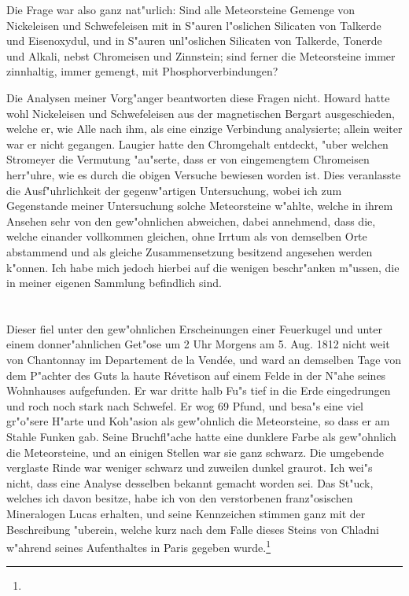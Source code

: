\documentclass[a4paper, 11pt, oneside]{article}
\begin{document}
Die Frage war also ganz nat"urlich: Sind alle Meteorsteine Gemenge von Nickeleisen und Schwefeleisen mit in S"auren l"oslichen Silicaten von Talkerde und Eisenoxydul, und in S"auren unl"oslichen Silicaten von Talkerde, Tonerde und Alkali, nebst Chromeisen und Zinnstein; sind ferner die Meteorsteine immer zinnhaltig, immer gemengt, mit Phosphorverbindungen?

Die Analysen meiner Vorg"anger beantworten diese Fragen nicht. Howard hatte wohl Nickeleisen und Schwefeleisen aus der magnetischen Bergart ausgeschieden, welche er, wie Alle nach ihm, als eine einzige Verbindung analysierte; allein weiter war er nicht gegangen. Laugier hatte den Chromgehalt entdeckt, "uber welchen Stromeyer die Vermutung "au"serte, dass er von eingemengtem Chromeisen herr"uhre, wie es durch die obigen Versuche bewiesen worden ist. Dies veranlasste die Ausf"uhrlichkeit der gegenw"artigen Untersuchung, wobei ich zum Gegenstande meiner Untersuchung solche Meteorsteine w"ahlte, welche in ihrem Ansehen sehr von den gew"ohnlichen abweichen, dabei annehmend, dass die, welche einander vollkommen gleichen, ohne Irrtum als von demselben Orte abstammend und als gleiche Zusammensetzung besitzend angesehen werden k"onnen. Ich habe mich jedoch hierbei auf die wenigen beschr"anken m"ussen, die in meiner eigenen Sammlung befindlich sind.

\section{}
\paragraph{}
Dieser fiel unter den gew"ohnlichen Erscheinungen einer Feuerkugel und unter einem donner"ahnlichen Get"ose um 2 Uhr Morgens am 5. Aug. 1812 nicht weit von Chantonnay im Departement de la Vendée, und ward an demselben Tage von dem P"achter des Guts la haute Révetison auf einem Felde in der N"ahe seines Wohnhauses aufgefunden. Er war dritte halb Fu"s tief in die Erde eingedrungen und roch noch stark nach Schwefel. Er wog 69 Pfund, und besa"s eine viel gr"o"sere H"arte und Koh"asion als gew"ohnlich die Meteorsteine, so dass er am Stahle Funken gab. Seine Bruchfl"ache hatte eine dunklere Farbe als gew"ohnlich die Meteorsteine, und an einigen Stellen war sie ganz schwarz. Die umgebende verglaste Rinde war weniger schwarz und zuweilen dunkel graurot. Ich wei"s nicht, dass eine Analyse desselben bekannt gemacht worden sei. Das St"uck, welches ich davon besitze, habe ich von den verstorbenen franz"osischen Mineralogen Lucas erhalten, und seine Kennzeichen stimmen ganz mit der Beschreibung "uberein, welche kurz nach dem Falle dieses Steins von Chladni w"ahrend seines Aufenthaltes in Paris gegeben wurde.\footnote{}
\end{document}
